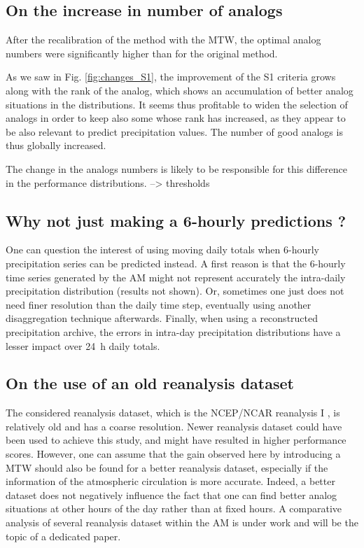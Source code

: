 \documentclass[hess, manuscript]{copernicus}
\begin{document}
\subsection{On the increase in number of analogs}

After the recalibration of the method with the MTW, the optimal analog numbers were significantly higher than for the original method. 





As we saw in Fig. \ref{fig:changes_S1}, the improvement of the S1 criteria grows along with the rank of the analog, which shows an accumulation of better analog situations in the distributions. It seems thus profitable to widen the selection of analogs in order to keep also some whose rank has increased, as they appear to be also relevant to predict precipitation values. The number of good analogs is thus globally increased.




The change in the analogs numbers is likely to be responsible for this difference in the performance distributions. --> thresholds



\subsection{Why not just making a 6-hourly predictions ?}

One can question the interest of using moving daily totals when 6-hourly precipitation series can be predicted instead. A first reason is that the 6-hourly time series generated by the AM might not represent accurately the intra-daily precipitation distribution (results not shown). Or, sometimes one just does not need finer resolution than the daily time step, eventually using another disaggregation technique afterwards. Finally, when using a reconstructed precipitation archive, the errors in intra-day precipitation distributions have a lesser impact over 24~h daily totals.

\subsection{On the use of an old reanalysis dataset}
\label{sec:old_reanalysis}

The considered reanalysis dataset, which is the NCEP/NCAR reanalysis I \citep{Kalnay1996}, is relatively old and has a coarse resolution. Newer reanalysis dataset could have been used to achieve this study, and might have resulted in higher performance scores. However, one can assume that the gain observed here by introducing a MTW should also be found for a better reanalysis dataset, especially if the information of the atmospheric circulation is more accurate. Indeed, a better dataset does not negatively influence the fact that one can find better analog situations at other hours of the day rather than at fixed hours. A comparative analysis of several reanalysis dataset within the AM is under work and will be the topic of a dedicated paper.
\end{document}
